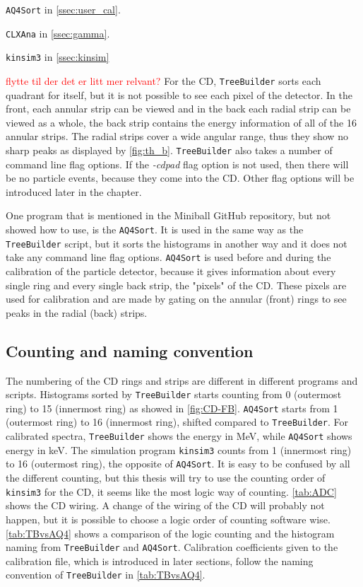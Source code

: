 \documentclass[twoside,english]{uiofysmaster/uiofysmaster}
\let\orgautoref\autoref
\renewcommand{\autoref}
        {%
		 \def\sectionautorefname{Section}%
		 \def\subsectionautorefname{Section}%
		 \def\subsubsectionautorefname{Section}%
		 \def\chapterautorefname{Chapter}%
          \orgautoref}
\begin{document}
\texttt{AQ4Sort} in \autoref{ssec:user_cal}.

\texttt{CLXAna} in \autoref{ssec:gamma}.

\texttt{kinsim3} in \autoref{ssec:kinsim}

\bigskip

\textcolor{red}{flytte til der det er litt mer relvant?}\newline
For the CD, \texttt{TreeBuilder} sorts each quadrant for itself, but it is not possible to see each pixel of the detector. 
In the front, each annular strip can be viewed and in the back each radial strip can be viewed as a whole, the back strip contains the energy information of all of the 16 annular strips. 
The radial strips cover a wide angular range, thus they show no sharp peaks as displayed by \autoref{fig:th_b}.
\texttt{TreeBuilder} also takes a number of command line flag options. 
If the \textit{-cdpad} flag option is not used, then there will be no particle events, because they come into the CD. 
Other flag options will be introduced later in the chapter.

One program that is mentioned in the Miniball GitHub repository, but not showed how to use, is the \texttt{AQ4Sort}. 
It is used in the same way as the \texttt{TreeBuilder} script, but it sorts the histograms in another way and it does not take any command line flag options. 
\texttt{AQ4Sort} is used before and during the calibration of the particle detector, because it gives information about every single ring and every single back strip, the "pixels" of the CD. 
These pixels are used for calibration and are made by gating on the annular (front) rings to see peaks in the radial (back) strips. 




\subsection{Counting and naming convention}
The numbering of the CD rings and strips are different in different programs and scripts. 
Histograms sorted by \texttt{TreeBuilder} starts counting from 0 (outermost ring) to 15 (innermost ring) as showed in \autoref{fig:CD-FB}. 
\texttt{AQ4Sort} starts from 1 (outermost ring) to 16 (innermost ring), shifted compared to \texttt{TreeBuilder}.
For calibrated spectra, \texttt{TreeBuilder} shows the energy in MeV, while \texttt{AQ4Sort} shows energy in keV.
The simulation program \texttt{kinsim3} counts from 1 (innermost ring) to 16 (outermost ring), the opposite of \texttt{AQ4Sort}. 
It is easy to be confused by all the different counting, but this thesis will try to use the counting order of \texttt{kinsim3} for the CD, it seems like the most logic way of counting. 
\autoref{tab:ADC} shows the CD wiring.
A change of the wiring of the CD will probably not happen, but it is possible to choose a logic order of counting software wise.
\autoref{tab:TBvsAQ4} shows a comparison of the logic counting and the histogram naming from \texttt{TreeBuilder} and \texttt{AQ4Sort}.
Calibration coefficients given to the calibration file, which is introduced in later sections, follow the naming convention of \texttt{TreeBuilder} in \autoref{tab:TBvsAQ4}.
\end{document}
